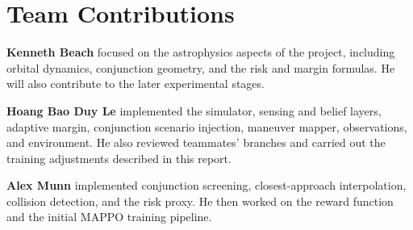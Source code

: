 \documentclass[conference]{IEEEtran}
\begin{document}
\section{Team Contributions}
\label{sec:team}

\textbf{Kenneth Beach} focused on the astrophysics aspects of the project, including orbital dynamics, conjunction geometry, and the risk and margin formulas. He will also contribute to the later experimental stages.

\textbf{Hoang Bao Duy Le} implemented the simulator, sensing and belief layers, adaptive margin, conjunction scenario injection, maneuver mapper, observations, and environment. He also reviewed teammates' branches and carried out the training adjustments described in this report.

\textbf{Alex Munn} implemented conjunction screening, closest-approach interpolation, collision detection, and the risk proxy. He then worked on the reward function and the initial MAPPO training pipeline.
\end{document}
